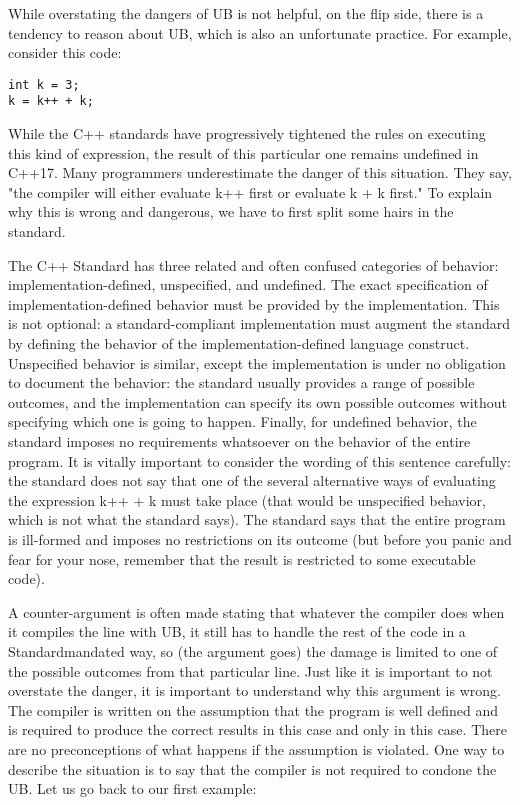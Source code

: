 While overstating the dangers of UB is not helpful, on the flip side, there is a tendency to reason about UB, which is also an unfortunate practice. For example, consider this code:

\begin{lstlisting}[style=styleCXX]
int k = 3;
k = k++ + k;
\end{lstlisting}

While the C++ standards have progressively tightened the rules on executing this kind of expression, the result of this particular one remains undefined in C++17. Many programmers underestimate the danger of this situation. They say, "the compiler will either evaluate k++ first or evaluate k + k first." To explain why this is wrong and dangerous, we have to first split some hairs in the standard.

The C++ Standard has three related and often confused categories of behavior: implementation-defined, unspecified, and undefined. The exact specification of implementation-defined behavior must be provided by the implementation. This is not optional: a standard-compliant implementation must augment the standard by defining the behavior of the implementation-defined language construct. Unspecified behavior is similar, except the implementation is under no obligation to document the behavior: the standard usually provides a range of possible outcomes, and the implementation can specify its own possible outcomes without specifying which one is going to happen. Finally, for undefined behavior, the standard imposes no requirements whatsoever on the behavior of the entire program. It is vitally important to consider the wording of this sentence carefully: the standard does not say that one of the several alternative ways of evaluating the expression k++ + k must take place (that would be unspecified behavior, which is not what the standard says). The standard says that the entire program is ill-formed and imposes no restrictions on its outcome (but before you panic and fear for your nose, remember that the result is restricted to some executable code).

A counter-argument is often made stating that whatever the compiler does when it compiles the line with UB, it still has to handle the rest of the code in a Standardmandated way, so (the argument goes) the damage is limited to one of the possible outcomes from that particular line. Just like it is important to not overstate the danger, it is important to understand why this argument is wrong. The compiler is written on the assumption that the program is well defined and is required to produce the correct results in this case and only in this case. There are no preconceptions of what happens if the assumption is violated. One way to describe the situation is to say that the compiler is not required to condone the UB. Let us go back to our first example:

